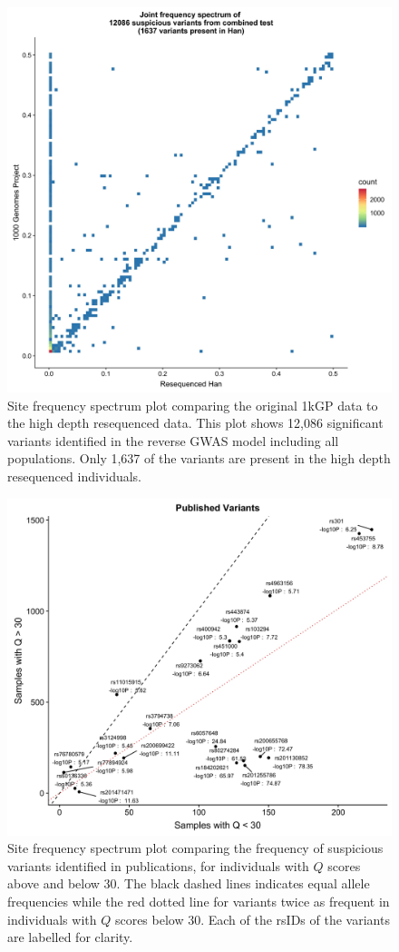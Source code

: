 \documentclass[9pt,lineno]{elife}
\begin{document}
\begin{figure}[h]
\centering
\includegraphics[width=12cm,keepaspectratio]{./Figures/Han_1kGP_SFS_FullModel.jpg}
\caption{Site frequency spectrum plot comparing the original 1kGP data to the high depth resequenced data. 
This plot shows  12,086 significant variants identified in the reverse GWAS model including all populations.
 Only 1,637 of the variants are present in the high depth resequenced individuals.}  
\label{90HanSFS_30}
\end{figure}

\begin{figure}[h]
\centering
\includegraphics[width=15cm,keepaspectratio]{./Figures/Published_OverUnder30.jpg}
\caption{Site frequency spectrum plot comparing the frequency of suspicious variants identified in publications, for individuals with $Q$ scores above and below 30. The black dashed lines indicates equal allele frequencies while the red dotted line for variants twice as frequent in individuals with $Q$ scores below 30. Each of the rsIDs of the variants are labelled for clarity.}  
\label{Pub_30}
\end{figure}
\end{document}
